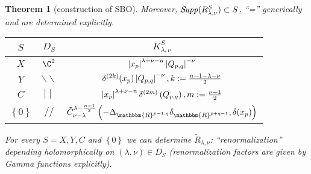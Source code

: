 \documentclass[portrait,final,paperwidth=90cm,paperheight=120cm,fontscale=0.3]{baposter}
\newcommand{\tmop}[1]{\ensuremath{\operatorname{#1}}}
\newtheorem{theorem}{Theorem}
\newcommand{\Supp}{\mathcal{S}\!{\it upp}}
\theoremstyle{definition}
\renewcommand{\Q}{Q_{p,q}}
\newcommand{\mm}{\mid\mid}
\newcommand{\bb}{\backslash\backslash}
\renewcommand{\ss}{//}
\begin{document}
\begin{poster}
{\begin{theorem}[construction of SBO]
	Moreover, $\Supp(R_{\lambda,\nu}^S)\subset S$, ``='' generically and are determined explicitly.\\
	\begin{center}
	\begin{tabular}{@{}|@{}c@{}|c|@{}c@{}|}
  \hline
  $S$ & $D_S$ & $K_{\lambda,\nu}^S$ \\
  \hline
  $X$ & $\C^2$ & $\myabs{x_p}^{\lambda+\nu-n}\myabs{\Q}^{-\nu}$ \\
  \hline
  $Y$ & $\bb$ & $\delta^{\left( 2k \right)}(x_p)\myabs{\Q}^{-\nu},k:=\frac{n-1-\lambda-\nu}{2}$ \\
  \hline
  $C$ & $\mm$ & $\myabs{x_p}^{\lambda+\nu-n}\delta^{(2m)}\left( \Q \right),m:=\frac{\nu-1}{2}$ \\
  \hline
  $\left\{ 0 \right\}$ & $\ss$ & $\tilde{C}_{\nu -
  \lambda}^{\lambda - \frac{n - 1}{2}} \left(-\Delta_{\mathbbm{R}^{p - 1, q}}
  \delta_{\mathbbm{R}^{p + q - 1}}, \delta (x_p)\right)$\\ \hline
\end{tabular}
	\end{center}
	For every $S=X,Y,C$ and $\left\{ 0 \right\}$ we can
	determine $\tilde{R}_{\lambda,\nu}$: ``renormalization'' 
	depending {\it holomorphically} on $(\lambda,\nu)\in D_S$ (renormalization factors are given by Gamma functions explicitly).

\end{theorem}}
\end{poster}
\end{document}
